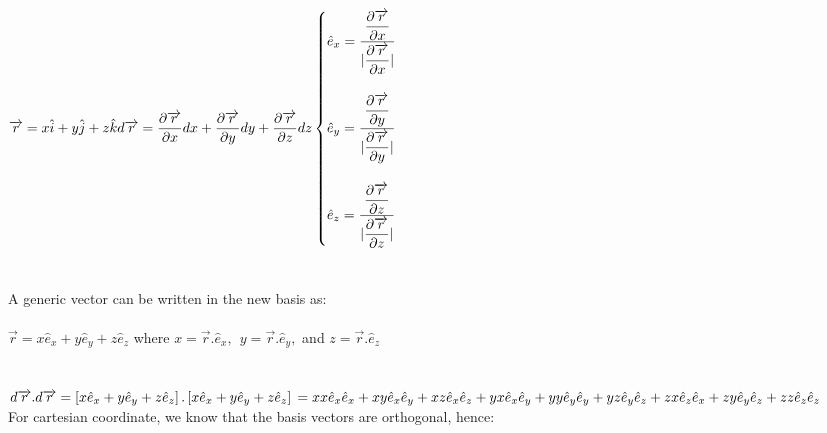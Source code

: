 \documentclass[fleqn]{article}
\begin{document}
\begin{enumerate}
    \textcolor{hwColor}{
      $
        \overrightarrow{r}=x \hat{i}+y\hat{j}+z\hat{k} \\
        \\
        d\overrightarrow{r}=\dfrac{\partial \overrightarrow{r}}{\partial x} dx+\dfrac{\partial \overrightarrow{r}}{\partial y} dy+\dfrac{\partial \overrightarrow{r}}{\partial z}dz \\
        \\
        \begin{cases}
          \hat{e}_x=\dfrac{\dfrac{\partial \overrightarrow{r}}{\partial x}}{|\dfrac{\partial \overrightarrow{r}}{\partial x}|} \\
          \\
          \hat{e}_y=\dfrac{\dfrac{\partial \overrightarrow{r}}{\partial y}}{|\dfrac{\partial \overrightarrow{r}}{\partial y}|}  \\
          \\
          \hat{e}_z=\dfrac{\dfrac{\partial \overrightarrow{r}}{\partial z}}{|\dfrac{\partial \overrightarrow{r}}{\partial z}|}  \\
        \end{cases} \\
        \\
      $
      \\
      \\
      \\
      A generic vector can be written in the new basis as: \\
      \\
      $\overrightarrow{r}=x \hat{e}_x+y \hat{e}_y+z \hat{e}_z$ where $x=\overrightarrow{r}.\hat{e}_x, ~~ y=\overrightarrow{r}.\hat{e}_y,$ and 
      $z=\overrightarrow{r}.\hat{e}_z$
      \\
      \\
      \\
      $
        d\overrightarrow{r}.d\overrightarrow{r}=\left[x \hat{e}_x+y \hat{e}_y+z \hat{e}_z\right].\left[x \hat{e}_x+y \hat{e}_y+z \hat{e}_z\right] \\
        \\
        =xx\hat{e}_x\hat{e}_x+xy \hat{e}_x \hat{e}_y+xz \hat{e}_x \hat{e}_z+yx \hat{e}_x \hat{e}_y+yy\hat{e}_y \hat{e}_y+yz \hat{e}_y \hat{e}_z+zx \hat{e}_z \hat{e}_x+zy \hat{e}_y \hat{e}_z+zz \hat{e}_z \hat{e}_z
      $
      \\
      For cartesian coordinate, we know that the basis vectors are orthogonal, hence: \\
      \\
}
\end{enumerate}
\end{document}
